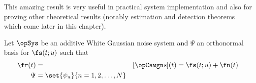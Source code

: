 This amazing result is very useful in practical system implementation
and also for proving other theoretical results
(notably estimation and detection theorems which come later
in this chapter).


\begin{theorem}
\label{thm:sstat}
 
  
Let $\opSys$ be an additive White Gaussian noise system and
$\Psi$ an orthonormal basis for $\fs(t;u)$ such that
\begin{align*}
   \fr(t)      &=   & [\opCawgn s](t) = \fs(t;u) + \fn(t)      \\
   \Psi      &= \set{\psi_n}{n=1,2,\ldots, N}
\end{align*}
\end{theorem}
